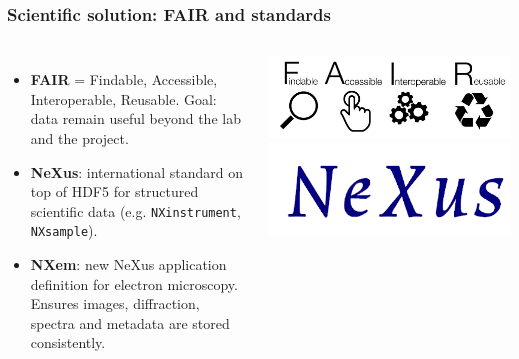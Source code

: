\documentclass{beamer}
\begin{document}
	
	
	\begin{frame}
		\frametitle{Scientific solution: FAIR and standards}
		\begin{columns}[T,totalwidth=\textwidth]
			\begin{itemize}
				\item \textbf{FAIR} = Findable, Accessible, Interoperable, Reusable.  
				Goal: data remain useful beyond the lab and the project.
				\item \textbf{NeXus}: international standard on top of HDF5 for structured scientific data  
				(e.g. \texttt{NXinstrument}, \texttt{NXsample}).
				\item \textbf{NXem}: new NeXus application definition for electron microscopy.  
				Ensures images, diffraction, spectra and metadata are stored consistently.
			\end{itemize}
			\includegraphics[width=\linewidth]{otherResources/FAIR_data_principles.png}\\[0.5em]
			\includegraphics[width=\linewidth]{otherResources/NEXUS_logo.png}
		\end{columns}
	\end{frame}
	
\end{document}
